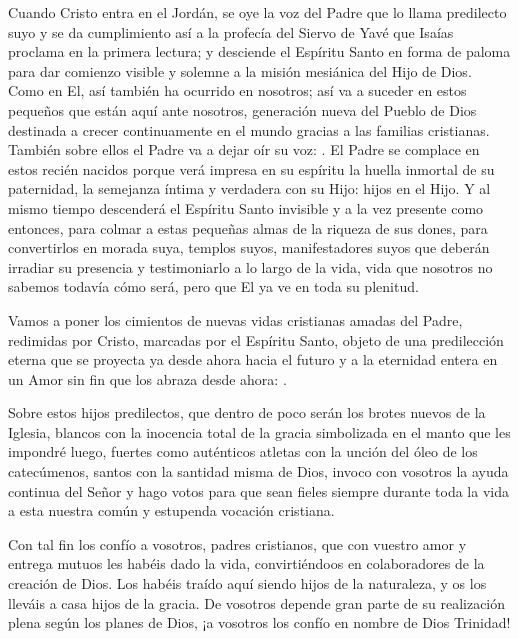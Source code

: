 {Cuando Cristo entra en el Jordán, se oye la voz del Padre que lo llama predilecto suyo y se da cumplimiento así a la profecía del Siervo de Yavé que Isaías proclama en la primera lectura; y desciende el Espíritu Santo en forma de paloma para dar comienzo visible y solemne a la misión mesiánica del Hijo de Dios. Como en El, así también ha ocurrido en nosotros; así va a suceder en estos pequeños que están aquí ante nosotros, generación nueva del Pueblo de Dios destinada a crecer continuamente en el mundo gracias a las familias cristianas. También sobre ellos el Padre va a dejar oír su voz: . El Padre se complace en estos recién nacidos porque verá impresa en su espíritu la huella inmortal de su paternidad, la semejanza íntima y verdadera con su Hijo: hijos en el Hijo. Y al mismo tiempo descenderá el Espíritu Santo invisible y a la vez presente como entonces, para colmar a estas pequeñas almas de la riqueza de sus dones, para convertirlos en morada suya, templos suyos, manifestadores suyos que deberán irradiar su presencia y testimoniarlo a lo largo de la vida, vida que nosotros no sabemos todavía cómo será, pero que El ya ve en toda su plenitud.

Vamos a poner los cimientos de nuevas vidas cristianas amadas del Padre, redimidas por Cristo, marcadas por el Espíritu Santo, objeto de una predilección eterna que se proyecta ya desde ahora hacia el futuro y a la eternidad entera en un Amor sin fin que los abraza desde ahora: .

Sobre estos hijos predilectos, que dentro de poco serán los brotes nuevos de la Iglesia, blancos con la inocencia total de la gracia simbolizada en el manto que les impondré luego, fuertes como auténticos atletas con la unción del óleo de los catecúmenos, santos con la santidad misma de Dios, invoco con vosotros la ayuda continua del Señor y hago votos para que sean fieles siempre durante toda la vida a esta nuestra común y estupenda vocación cristiana.

Con tal fin los confío a vosotros, padres cristianos, que con vuestro amor y entrega mutuos les habéis dado la vida, convirtiéndoos en colaboradores de la creación de Dios. Los habéis traído aquí siendo hijos de la naturaleza, y os los lleváis a casa hijos de la gracia. De vosotros depende gran parte de su realización plena según los planes de Dios, ¡a vosotros los confío en nombre de Dios Trinidad!

}
